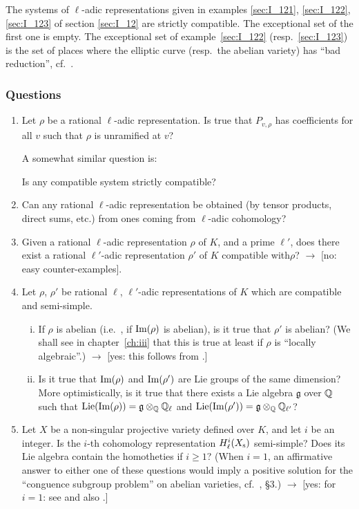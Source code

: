 \begin{ex}
The systems of $\ell$-adic representations given in examples \ref{sec:I_121},
\ref{sec:I_122}, \ref{sec:I_123} of section \ref{sec:I_12} are strictly
compatible. The exceptional set of the first one is empty. The exceptional set
of example~\ref{sec:I_122} (resp.\ \ref{sec:I_123}) is the set of
places where the elliptic curve (resp.\ the abelian variety) has ``bad
reduction'', cf.\ \cite{32}.
\end{ex}

\subsubsection*{Questions}
\begin{enumerate}
	\item Let $\rho$ be a rational $\ell$-adic representation. Is true that $P_{v,\rho}$ has coefficients for all $v$ such that $\rho$ is unramified at $v$?

A somewhat similar question is:

	Is any compatible system strictly compatible?
	\item Can any rational $\ell$-adic representation be obtained (by tensor products, direct sums, etc.) from ones coming from $\ell$-adic cohomology?
	\item Given a rational $\ell$-adic representation $\rho$ of $K$, and a prime $\ell'$, does there exist a rational $\ell'$-adic representation $\rho'$ of $K$ compatible with\break $\rho$? $\rightarrow$ [no: easy counter-examples].
	\item Let $\rho$, $\rho'$ be rational $\ell$, $\ell'$-adic representations of $K$ which are compatible and semi-simple.
	\begin{enumerate}[(i)]
		\item If $\rho$ is abelian (i.e.\ , if $\operatorname{Im}(\rho)$ is abelian), is it true that $\rho'$ is abelian? (We shall see in chapter~\ref{ch:iii} that this is true at least if $\rho$ is ``locally algebraic''.) $\rightarrow$ [yes: this follows from \cite{36}.]
		\item Is it true that $\operatorname{Im}(\rho)$ and $\operatorname{Im}(\rho')$ are Lie groups of the
\dpage		
		same dimension? More optimistically, is it true that there exists a Lie algebra $\mathfrak{g}$ over $\mathbb{Q}$ such that $\operatorname{Lie}(\operatorname{Im}(\rho)) = \mathfrak{g} \otimes_{\mathbb{Q}} \mathbb{Q}_{\ell}$ and $\operatorname{Lie}(\operatorname{Im}(\rho')) = \mathfrak{g} \otimes_{\mathbb{Q}} \mathbb{Q}_{\ell'}$?
	\end{enumerate}
	\item Let $X$ be a non-singular projective variety defined over $K$, and
	let $i$ be an integer. Is the $i$-th cohomology representation $H_\ell^i(X_{\mathrm{s}})$ semi-simple? Does its Lie algebra contain the homotheties if $i\geq1$? (When $i=1$, an affirmative answer to either one of these questions would imply a positive solution for the ``conguence subgroup problem'' on abelian varieties, cf.\ \cite{24}, \S3.) $\rightarrow$ [yes: for $i=1$: see \cite{48} and also \cite{75}.]
\end{enumerate}

